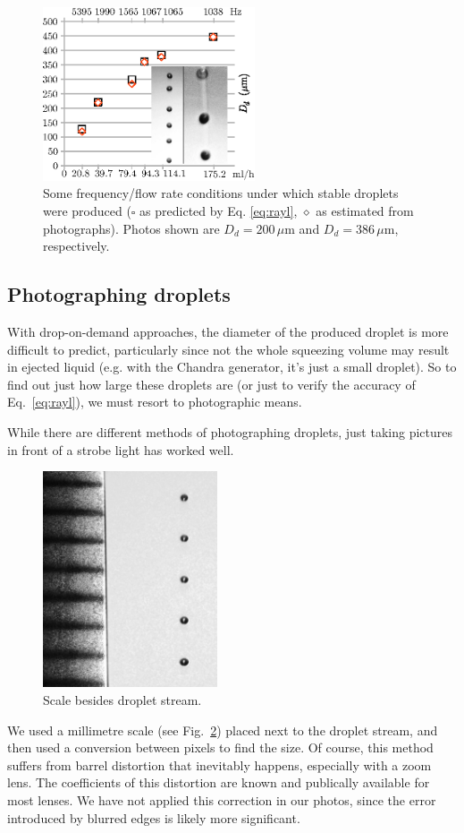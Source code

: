 \documentclass[11.5pt,oneside]{book}
\newcommand*{\figref}[1]{Fig.~\ref{#1}}
\begin{document}
\begin{figure}[h!]
\centering
\includegraphics[width=0.56\textwidth]{papers/hdg_images/sizes.eps}
\caption{Some frequency/flow rate conditions under which stable droplets were
        produced ($\square$ as predicted by Eq. \ref{eq:rayl},
        {\Large$\diamond$} as estimated
        from photographs). Photos shown are $D_d = 200\,\mu$m and $D_d = 386\,\mu$m,
        respectively.
       \label{fig:dropphoto}}
\end{figure}

\subsection{Photographing droplets}
With drop-on-demand approaches, the diameter of the produced droplet is more
difficult to predict, particularly since not the whole squeezing volume may
result in ejected liquid (e.g. with the Chandra generator, it's just a small
droplet). So to find out just how large these droplets are (or just to verify the accuracy of
Eq.~\eqref{eq:rayl}), we must resort to photographic means.

While there are different methods of photographing droplets, just taking
pictures in front of a strobe light has worked well.
\begin{figure}[h]
\centering
\includegraphics[width=0.46\textwidth]{img/dropletscale.jpg}
\caption{Scale besides droplet stream. \label{fig:dropletscale}}
\end{figure}
We used a millimetre scale (see \figref{fig:dropletscale}) placed next to the droplet stream, and then used a conversion
between pixels to find the size. Of course, this method suffers from barrel
distortion that inevitably happens, especially with a zoom lens. The
coefficients of this distortion are known and publically available for most
lenses. We have not applied this correction in our photos, since the error
introduced by blurred edges is likely more significant.
\end{document}
